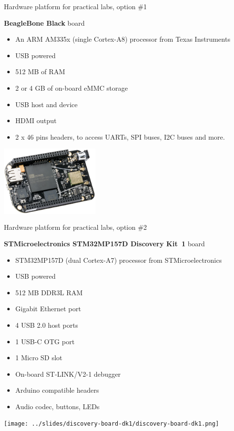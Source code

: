 \documentclass[a4paper,12pt,obeyspaces,spaces,hyphens]{article}
\begin{document}
\feagendatwocolumn
{Hardware platform for practical labs, option \#1}
{
  {\bf BeagleBone Black} board
  \begin{itemize}
  \item An ARM AM335x (single Cortex-A8) processor from Texas
    Instruments
  \item USB powered
  \item 512 MB of RAM
  \item 2 or 4 GB of on-board eMMC storage
  \item USB host and device
  \item HDMI output
  \item 2 x 46 pins headers, to access UARTs, SPI buses, I2C buses
    and more.
  \end{itemize}
}
{}
{
  \begin{center}
    \includegraphics[width=5cm]{../slides/beagleboneblack-board/beagleboneblack.png}
  \end{center}
}

\feagendatwocolumn
{Hardware platform for practical labs, option \#2}
{
  {\bf STMicroelectronics STM32MP157D Discovery Kit~1} board
  \begin{itemize}
  \item STM32MP157D (dual Cortex-A7) processor from STMicroelectronics
  \item USB powered
  \item 512 MB DDR3L RAM
  \item Gigabit Ethernet port
  \item 4 USB 2.0 host ports
  \item 1 USB-C OTG port
  \item 1 Micro SD slot
  \item On-board ST-LINK/V2-1 debugger
  \item Arduino compatible headers
  \item Audio codec, buttons, LEDs
  \end{itemize}
}
{}
{
  \begin{center}
    \texttt{[image: ../slides/discovery-board-dk1/discovery-board-dk1.png]}
  \end{center}
}
\end{document}
